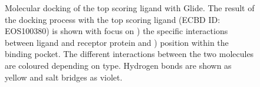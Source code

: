 \documentclass[11pt, letterpaper, titlepage]{article}
\begin{document}
\begin{figure}[htp]
	\centering
	\captionsetup[subfigure]{skip=-20pt,position=top,labelfont=bf,labelformat=parens,singlelinecheck=false}
	\caption{Molecular docking of the top scoring ligand with Glide. The result of the docking process with the top scoring ligand (ECBD ID: EOS100380) is shown with focus on ) the specific interactions between ligand and receptor protein and ) position within the binding pocket. The different interactions between the two molecules are coloured depending on type. Hydrogen bonds are shown as yellow and salt bridges as violet.}\label{fig:docking_EOS100380}
\end{figure}
\end{document}
